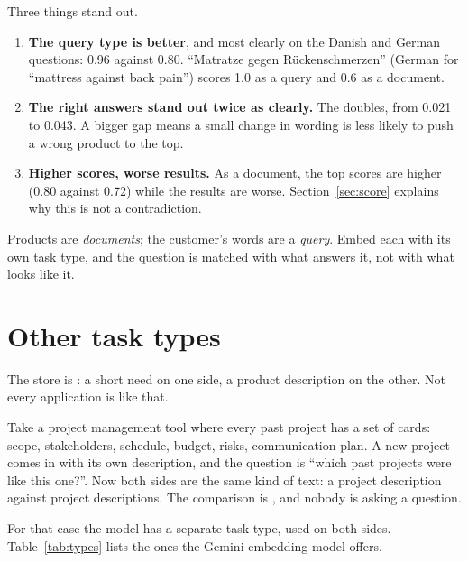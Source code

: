 \documentclass[11pt]{article}
\begin{document}
Three things stand out.
\begin{enumerate}[leftmargin=1.4em, itemsep=3pt]
\item \textbf{The query type is better}, and most clearly on the Danish
  and German questions: 0.96 against 0.80. ``Matratze gegen
  Rückenschmerzen'' (German for ``mattress against back pain'') scores
  1.0 as a query and 0.6 as a document.
\item \textbf{The right answers stand out twice as clearly.} The
   doubles, from 0.021 to 0.043. A bigger gap
  means a small change in wording is less likely to push a wrong
  product to the top.
\item \textbf{Higher scores, worse results.} As a document, the top
  scores are higher (0.80 against 0.72) while the results are worse.
  Section~\ref{sec:score} explains why this is not a contradiction.
\end{enumerate}

\begin{keypoint}
Products are \emph{documents}; the customer's words are a
\emph{query}. Embed each with its own task type, and the question is
matched with what answers it, not with what looks like it.
\end{keypoint}

\section{Other task types}
\label{sec:types}

The store is : a short need on one side, a product description on the other.
Not every application is like that.

Take a project management tool where every past project has a set of
cards: scope, stakeholders, schedule, budget, risks, communication
plan. A new project comes in with its own description, and the
question is ``which past projects were like this one?''. Now both sides
are the same kind of text: a project description against project
descriptions. The comparison is , and nobody
is asking a question.

For that case the model has a separate task type, used on both sides.
Table~\ref{tab:types} lists the ones the Gemini embedding model offers.
\end{document}
